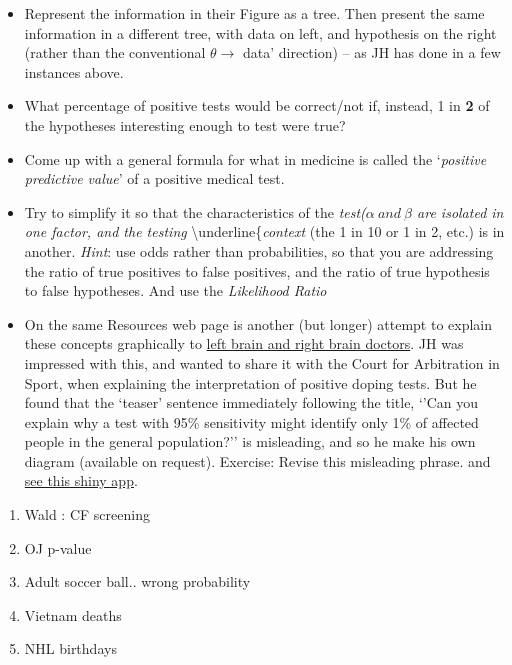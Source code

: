 \documentclass[]{book}
\begin{document}
\begin{itemize}
\item
  Represent the information in their Figure as
  a tree. Then present the same information in a different tree, with data on left, and hypothesis on the right
  (rather than the conventional \(\theta \rightarrow\) data' direction) -- as JH has done in a few instances above.
\item
  What percentage of positive tests would be correct/not if, instead, 1 in \textbf{2} of the hypotheses interesting enough to test were true?
\item
  Come up with a general formula for what in medicine is called the `\emph{positive predictive value}' of a positive medical test.
\item
  Try to simplify it so that the characteristics of the \emph{test(\(\alpha \ and \ \beta\) are isolated in one factor, and the testing }\textbackslash{}underline\{\emph{context} (the 1 in 10 or 1 in 2, etc.) is in another.
  \emph{Hint}: use odds rather than probabilities, so that you
  are addressing the ratio of true positives to false positives, and the ratio of true hypothesis to false hypotheses. And use the \emph{Likelihood Ratio}
\item
  On the same Resources web page is another (but longer)
  attempt to explain these concepts graphically to \href{http://www.biostat.mcgill.ca/hanley/bios601/CandH-ch0102/RightSideLeftSide.pdf}{left brain and right brain doctors}.
  JH was impressed with this, and wanted to share it with
  the Court for Arbitration in Sport, when explaining the interpretation
  of positive doping tests. But he found that the
  `teaser' sentence immediately following the title, `'Can you explain why a test with 95\% sensitivity might identify only 1\% of affected people in the general population?''
  is misleading, and so he make his own diagram (available on request). Exercise: Revise this misleading phrase.
  and
  \href{http://shinyapps.org/apps/PPV/}{see this shiny app}.
\end{itemize}

\begin{enumerate}
\def\labelenumi{\arabic{enumi}.}
\setcounter{enumi}{7}
\item
  Wald : CF screening
\item
  OJ p-value
\item
  Adult soccer ball.. wrong probability
\item
  Vietnam deaths
\item
  NHL birthdays
\end{enumerate}
\end{document}
